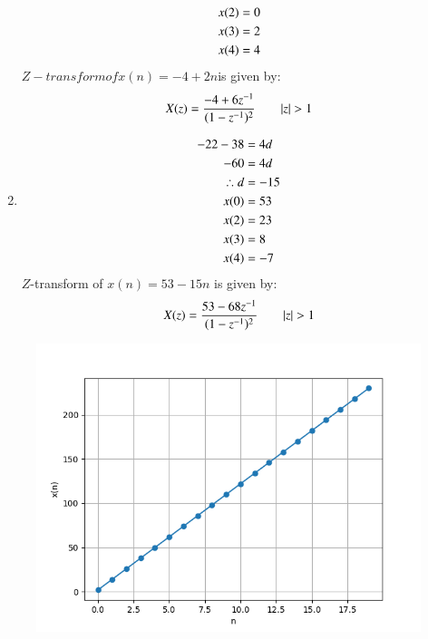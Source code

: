 \documentclass[journal,12pt,twocolumn]{IEEEtran}
\theoremstyle{remark}
\begin{document}
\begin{center}
\begin{enumerate}
\begin{align}
          x(2)&=0\\
          x(3)&=2 \\
          x(4)&=4 \notag\\
    \end{align}
    $Z-transform of x(n) = -4 + 2n $is given by:
    \begin{align}
       &X(z)=\frac{-4+6{z^{-1}}}{(1-{z^{-1}})^2} \qquad  |z|>1  \notag\\
    \end{align}
       \item    
     \begin{align}
         -22-38&=4d\\
          -60&=4d\\
           \therefore d&=-15\\
            x(0)&=53\\
            x(2)&=23\\
            x(3)&=8\\
            x(4)&=-7 \notag\\
     \end{align}
     $Z$-transform of $x(n) = 53 - 15n$ is given by:
\begin{align}
       &X(z)=\frac{53-68{z^{-1}}}{(1-{z^{-1}})^2}\qquad|z|>1 \notag \\
\end{align}
\end{enumerate}             
          
\end{center}

\begin{figure}[h]
       \centering
        \includegraphics[width=1\linewidth]{figs/download.png} %
        \caption{}
\end{figure}
\end{document}
